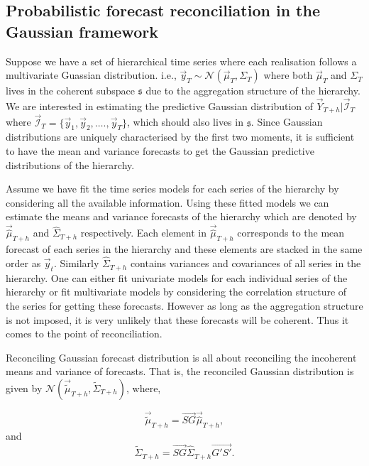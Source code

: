 \documentclass[graybox]{svmult}
\begin{document}
\subsection{Probabilistic forecast reconciliation in the Gaussian framework}

Suppose we have a set of hierarchical time series where each realisation follows a multivariate Guassian distribution. i.e., $\vec{y}_T \sim \mathscr{N}(\vec{\mu}_T, \Sigma_T)$ where both $\vec{\mu}_T$ and $\Sigma_T$ lives in the coherent subspace $\mathfrak{s}$ due to the aggregation structure of the hierarchy. We are interested in estimating the predictive Gaussian distribution of $\vec{Y}_{T+h}| \vec{\mathscr{I}}_T$ where $\vec{\mathscr{I}}_T= \{\vec{y}_1,\vec{y}_2,\dots.,\vec{y}_T\}$, which should also lives in $\mathfrak{s}$. Since Gaussian distributions are uniquely characterised by the first two moments, it is sufficient to have the mean and variance forecasts to get the Gaussian predictive distributions of the hierarchy.

Assume we have fit the time series models for each series of the hierarchy by considering all the available information. Using these fitted models we can estimate the means and variance forecasts of the hierarchy which are denoted by $\vec{\hat{\mu}}_{T+h}$ and $\hat{\Sigma}_{T+h}$ respectively. Each element in $\vec{\hat{\mu}}_{T+h}$ corresponds to the mean forecast of each series in the hierarchy and these elements are stacked in the same order as $\vec{y}_t$. Similarly $\hat{\Sigma}_{T+h}$ contains variances and covariances of all series in the hierarchy. One can either fit univariate models for each individual series of the hierarchy or fit multivariate models by considering the correlation structure of the series for getting these forecasts. However as long as the aggregation structure is not imposed, it is very unlikely that these forecasts will be coherent. Thus it comes to the point of reconciliation.

Reconciling Gaussian forecast distribution is all about reconciling the incoherent means and variance of forecasts. That is, the reconciled Gaussian distribution is given by $\mathscr{N}(\vec{\tilde{\mu}}_{T+h}, \tilde{\Sigma}_{T+h})$, where,

\begin{equation}\label{eq:17}
\vec{\tilde{\mu}}_{T+h} = \vec{SG}\vec{\hat{\mu}}_{T+h},
\end{equation}
and
\begin{equation}\label{eq:18}
\tilde{\Sigma}_{T+h} = \vec{SG}\hat{\Sigma}_{T+h}\vec{G'S'}.
\end{equation}
\end{document}
